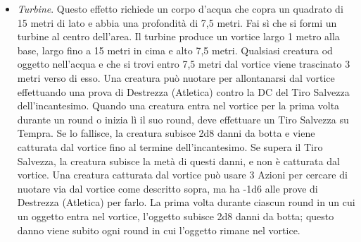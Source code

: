 \begin{multicols}{2}
\begin{itemize}
\item 
\textit{Turbine}. Questo effetto richiede un corpo d’acqua che copra un quadrato di 15 metri di lato e abbia una profondità di 7,5 metri. Fai sì che si formi un turbine al centro dell'area. Il turbine produce un vortice largo 1 metro alla base, largo fino a 15 metri in cima e alto 7,5
metri. Qualsiasi creatura od oggetto nell'acqua e che si trovi entro 7,5 metri dal vortice viene trascinato 3 metri verso di esso. Una creatura può nuotare per allontanarsi dal vortice effettuando una prova di Destrezza (Atletica) contro la DC del Tiro Salvezza dell'incantesimo.
Quando una creatura entra nel vortice per la prima volta durante un round o inizia lì il suo round, deve effettuare un Tiro Salvezza su Tempra. Se lo fallisce, la creatura subisce 2d8 danni da botta e viene catturata dal vortice fino al termine dell'incantesimo. Se supera il Tiro Salvezza, la creatura subisce la metà di questi danni, e non è catturata dal vortice. Una creatura catturata dal vortice può usare 3 Azioni per cercare di nuotare via dal vortice come descritto sopra, ma ha -1d6 alle prove di Destrezza (Atletica) per farlo. La prima volta durante ciascun round in un cui un oggetto entra nel vortice, l’oggetto subisce 2d8 danni da botta; questo danno viene subito ogni round in cui l’oggetto rimane nel vortice.
\end{itemize}



\end{multicols}
